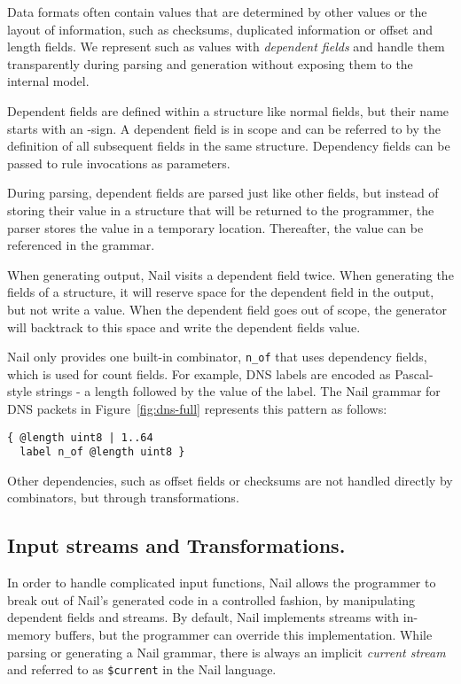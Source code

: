 Data formats often contain values that are determined by other values or the layout of information,
such as checksums, duplicated information  or offset and  length fields.
We represent such as values with \emph{dependent fields} and handle them transparently during
parsing and generation without exposing them to the internal model. 


Dependent fields are defined within a structure like normal fields, but their name starts with an \@-sign. 
A dependent field is in scope and can be referred to by the definition of all subsequent fields in
the same structure. Dependency fields can be passed to rule invocations as parameters.

During parsing, dependent fields are parsed just like other fields, but instead of storing their
value in a structure that will be returned to the programmer, the parser stores the value in a
temporary location. Thereafter, the value can be referenced in the grammar. 

When generating output, Nail visits a dependent field twice. When generating the fields of a
structure, it will reserve space for the dependent field in the output, but not write a value. When
the dependent field goes out of scope, the generator will backtrack to this space and write the
dependent fields value.

Nail only provides one built-in combinator, \texttt{n_of} that uses dependency fields, which is used
for count fields. For example, DNS labels are encoded as Pascal-style strings - a length followed by
the value of the label. The Nail grammar for DNS packets in Figure~\ref{fig:dns-full} represents
this pattern as follows:

\begin{verbatim}
{ @length uint8 | 1..64
  label n_of @length uint8 }
\end{verbatim}

Other dependencies, such as offset fields or checksums are not handled directly by combinators, but
through  transformations.

\subsection{Input streams and Transformations.}

In order to handle complicated input functions, Nail allows the programmer to
break out of Nail's generated code in a controlled fashion, by manipulating dependent fields and
streams. 
By default, Nail implements streams with in-memory buffers, but the programmer can override this implementation.
While parsing or generating a Nail grammar, there is always an implicit \emph{current stream} and
referred to as \texttt{\$current} in the Nail language.

